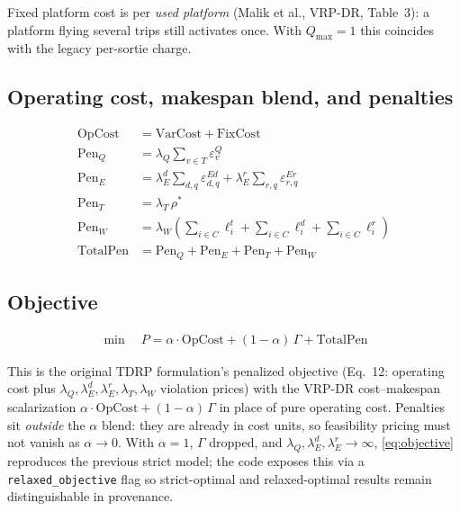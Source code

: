 \documentclass[10pt]{article}
\begin{document}
\noindent Fixed platform cost is per \emph{used platform} (Malik et al.,
VRP-DR, Table~3): a platform flying several trips still activates once. With
$Q_{\max}=1$ this coincides with the legacy per-sortie charge.

\subsection{Operating cost, makespan blend, and penalties}
\begin{align}
\mathrm{OpCost} &= \mathrm{VarCost} + \mathrm{FixCost} \label{eq:opcost}\\
\mathrm{Pen}_Q &= \lambda_Q \sum_{v\in T} \varepsilon^Q_v \label{eq:pen-cap}\\
\mathrm{Pen}_E &= \lambda^d_E \sum_{d,q} \varepsilon^{Ed}_{d,q}
               + \lambda^r_E \sum_{r,q} \varepsilon^{Er}_{r,q} \label{eq:pen-end}\\
\mathrm{Pen}_T &= \lambda_T\, \rho^* \label{eq:pen-route}\\
\mathrm{Pen}_W &= \lambda_W \left(\sum_{i\in C}\ell^t_i + \sum_{i\in C}\ell^d_i + \sum_{i\in C}\ell^r_i\right) \label{eq:pen-tw}\\
\mathrm{TotalPen} &= \mathrm{Pen}_Q + \mathrm{Pen}_E + \mathrm{Pen}_T + \mathrm{Pen}_W \label{eq:totalpen}
\end{align}

\subsection{Objective}
\begin{align}
\min\quad P = \alpha\cdot\mathrm{OpCost} + (1-\alpha)\,\Gamma + \mathrm{TotalPen} \label{eq:objective}
\end{align}

\noindent This is the original TDRP formulation's penalized objective
(Eq.~12: operating cost plus $\lambda_Q, \lambda^d_E, \lambda^r_E, \lambda_T,
\lambda_W$ violation prices) with the VRP-DR cost--makespan scalarization
$\alpha\cdot\mathrm{OpCost} + (1-\alpha)\,\Gamma$ in place of pure operating
cost. Penalties sit \emph{outside} the $\alpha$ blend: they are already in cost
units, so feasibility pricing must not vanish as $\alpha\to 0$.
With $\alpha = 1$, $\Gamma$ dropped, and
$\lambda_Q,\lambda^d_E,\lambda^r_E\to\infty$, \eqref{eq:objective} reproduces
the previous strict model; the code exposes this via a
\texttt{relaxed\_objective} flag so strict-optimal and relaxed-optimal results
remain distinguishable in provenance.
\end{document}
